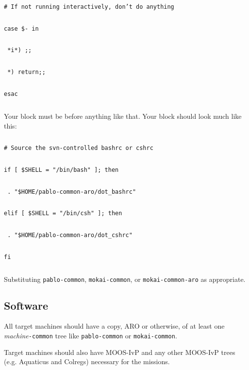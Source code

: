 \documentclass[11pt]{article}
\newcommand{\cmdline}[1]{\vspace{.2em} $\:$\\ \begin{minipage}{\dimexpr\textwidth-2cm}
\texttt{#1}
\end{minipage} $\:$\\ \vspace{-.2em} }
\begin{document}
\cmdline{\# If not running interactively, don't do anything}
\cmdline{case \$- in}
\cmdline{    *i*) ;;}
\cmdline{      *) return;;}
\cmdline{esac}

Your block must be before anything like that. Your block should look much like this:

\cmdline{\# Source the svn-controlled bashrc or cshrc}
\cmdline{if [ \$SHELL = "/bin/bash" ]; then}
\cmdline{    . "\$HOME/pablo-common-aro/dot\_bashrc"}
\cmdline{elif [ \$SHELL = "/bin/csh" ]; then}
\cmdline{    . "\$HOME/pablo-common-aro/dot\_cshrc"}
\cmdline{fi}

Substituting \texttt{pablo-common}, \texttt{mokai-common}, or \texttt{mokai-common-aro} as appropriate.

\subsection{Software}
All target machines should have a copy, ARO or otherwise, of at least one \textit{machine}\texttt{-common} tree like \texttt{pablo-common} or \texttt{mokai-common}.

Target machines should also have MOOS-IvP and any other MOOS-IvP trees (e.g. Aquaticus and Colregs) necessary for the missions.
\end{document}
